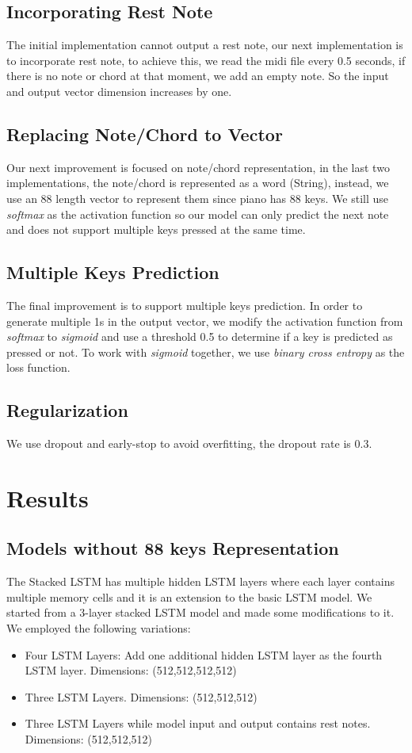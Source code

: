 \documentclass[conference]{IEEEtran}
\begin{document}
\subsection{Incorporating Rest Note}
The initial implementation cannot output a rest note, our next implementation is to incorporate rest note, to achieve this, we read the midi file every 0.5 seconds, if there is no note or chord at that moment, we add an empty note. So the input and output vector dimension increases by one.

\subsection{Replacing Note/Chord to Vector}
Our next improvement is focused on note/chord representation, in the last two implementations, the note/chord is represented as a word (String), instead, we use an 88 length vector to represent them since piano has 88 keys. We still use \textit{softmax} as the activation function so our model can only predict the next note and does not support multiple keys pressed at the same time.

\subsection{Multiple Keys Prediction}
The final improvement is to support multiple keys prediction. In order to generate multiple 1s in the output vector, we modify the activation function from \textit{softmax} to \textit{sigmoid} and use a threshold 0.5 to determine if a key is predicted as pressed or not. To work with \textit{sigmoid} together, we use \textit{binary cross entropy} as the loss function.

\subsection{Regularization}
We use dropout and early-stop to avoid overfitting, the dropout rate is 0.3.

\section{Results}
\subsection{Models without 88 keys Representation}
The Stacked LSTM has multiple hidden LSTM layers where each layer contains multiple memory cells and it is an extension to the basic LSTM model. We started from a 3-layer stacked LSTM model and made some modifications to it. We employed the following variations: 
\begin{itemize}
\item Four LSTM Layers: Add one additional hidden LSTM layer as the fourth LSTM layer.
Dimensions: (512,512,512,512)
\item Three LSTM Layers. 
Dimensions: (512,512,512)
\item Three LSTM Layers while model input and output contains rest notes.
Dimensions: (512,512,512)
\end{itemize}
\end{document}
